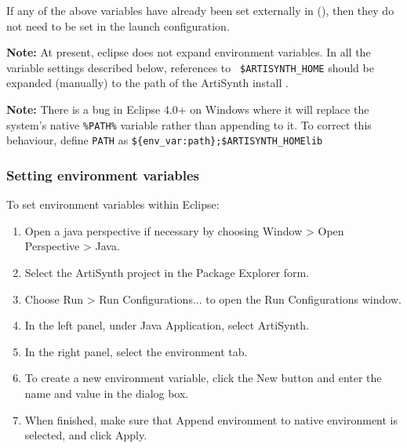 If any of the above variables have already been set externally in
\SYSTEM (\environmentSectionRef), then they do not need to
be set in the launch configuration.

\begin{sideblock}
{\bf Note:} At present, eclipse does not expand environment variables.
In all the variable settings described below, references to {\tt
\$ARTISYNTH\_HOME} should be expanded (manually) to the path of the
ArtiSynth install \directory.
\end{sideblock}

\ifWindows
\begin{sideblock}
{\bf Note:} There is a bug in Eclipse 4.0+ on Windows where it will replace 
the system's native {\tt \%PATH\%} variable rather than appending to it.  
To correct this behaviour, define {\tt PATH} as 
{\tt \$\{env\_var:path\};\$ARTISYNTH\_HOME\SEP lib\SEP \ARCH} 
\end{sideblock}
\fi

\subsubsection {Setting environment variables}
\label{SettingEnvironmentVariables}

To set environment variables within Eclipse:

\begin{enumerate}

\item Open a java perspective if necessary by choosing
  {\sf Window > Open Perspective > Java}.

\item Select the ArtiSynth project in the {\sf Package Explorer} form.

\item Choose {\sf Run > Run Configurations...} to open the {\sf Run
  Configurations} window.

\item In the left panel, under {\sf Java Application}, select {\sf ArtiSynth}.

\item In the right panel, select the {\sf environment} tab.

\item To create a new environment variable, click the {\sf New} button and
  enter the name and value in the dialog box.

\item When finished, make sure that {\sf Append environment to native
  environment} is selected, and click {\sf Apply}.

\end{enumerate}

